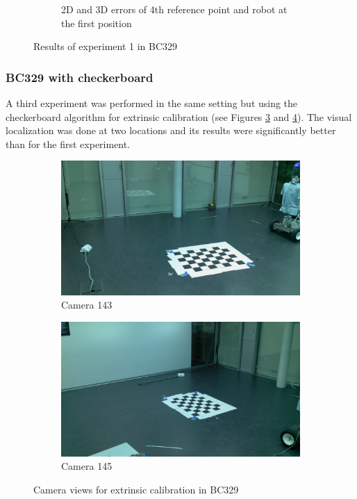 \begin{figure}[H]
\begin{subfigure}{0.49\linewidth}
        \caption{2D and 3D errors of 4th reference point and robot at the first position}
        \label{fig:res1_combi}
    \end{subfigure}
    \caption{Results of experiment 1 in BC329}
    \label{fig:experiment1}
\end{figure}



\subsubsection{BC329 with checkerboard}

A third experiment was performed in the same setting but using the checkerboard algorithm for extrinsic calibration (see Figures \ref{fig:res2_image_143} and  \ref{fig:res2_image_145}). 
The visual localization was done at two locations and its results were significantly better than for the first experiment. 

\begin{figure}[H]
    \centering
    \begin{subfigure}{0.49\linewidth}
        \centering
        \includegraphics[width=\linewidth]{files/res2_image_143.png}
        \caption{Camera 143}
        \label{fig:res2_image_143}
    \end{subfigure}
    \begin{subfigure}{0.49\linewidth}
        \centering
        \includegraphics[width=\linewidth]{files/res2_image_145.png}
        \caption{Camera 145}
        \label{fig:res2_image_145}
    \end{subfigure}
    \caption{Camera views for extrinsic calibration in BC329}
    \label{fig:experiment1}
\end{figure}

